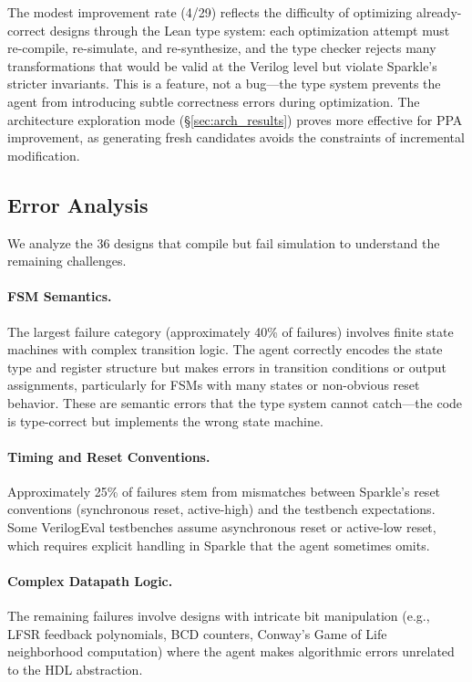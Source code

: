 The modest improvement rate (4/29) reflects the difficulty of optimizing already-correct designs through the Lean type system: each optimization attempt must re-compile, re-simulate, and re-synthesize, and the type checker rejects many transformations that would be valid at the Verilog level but violate Sparkle's stricter invariants. This is a feature, not a bug---the type system prevents the agent from introducing subtle correctness errors during optimization. The architecture exploration mode (\S\ref{sec:arch_results}) proves more effective for PPA improvement, as generating fresh candidates avoids the constraints of incremental modification.

\subsection{Error Analysis}
\label{sec:error_analysis}

We analyze the 36 designs that compile but fail simulation to understand the remaining challenges.

\paragraph{FSM Semantics.}
The largest failure category (approximately 40\% of failures) involves finite state machines with complex transition logic. The agent correctly encodes the state type and register structure but makes errors in transition conditions or output assignments, particularly for FSMs with many states or non-obvious reset behavior. These are semantic errors that the type system cannot catch---the code is type-correct but implements the wrong state machine.

\paragraph{Timing and Reset Conventions.}
Approximately 25\% of failures stem from mismatches between Sparkle's reset conventions (synchronous reset, active-high) and the testbench expectations. Some VerilogEval testbenches assume asynchronous reset or active-low reset, which requires explicit handling in Sparkle that the agent sometimes omits.

\paragraph{Complex Datapath Logic.}
The remaining failures involve designs with intricate bit manipulation (e.g., LFSR feedback polynomials, BCD counters, Conway's Game of Life neighborhood computation) where the agent makes algorithmic errors unrelated to the HDL abstraction.

